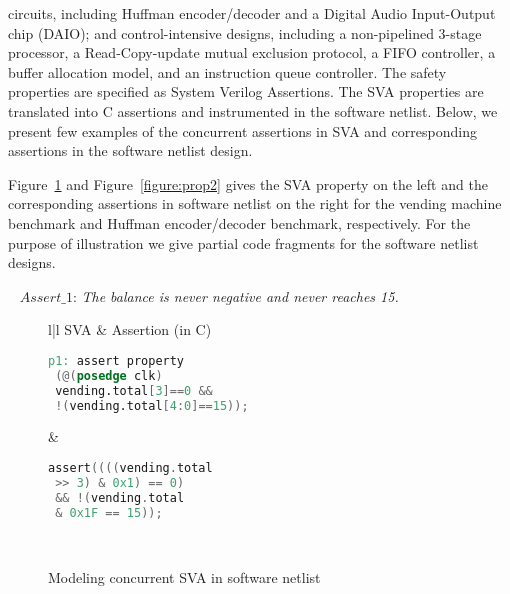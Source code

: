 circuits, including Huffman encoder/decoder and a Digital Audio
Input-Output chip (DAIO); and control-intensive designs,
including a non-pipelined 3-stage processor, a Read-Copy-update
mutual exclusion protocol, a FIFO controller, a buffer allocation model,
and an instruction queue controller.   
%
%
The safety properties are specified as System Verilog Assertions.
The SVA properties are translated into C assertions and instrumented 
in the software netlist. 
%
Below, we present few examples of the concurrent assertions in SVA 
and corresponding assertions in the software netlist design.  


Figure~\ref{figure:prop1} and Figure~\ref{figure:prop2} gives 
the SVA property on the left and the corresponding assertions 
in software netlist on the right for the vending machine benchmark 
and Huffman encoder/decoder benchmark, respectively. For the purpose 
of illustration we give partial code fragments for the software 
netlist designs.
%
\begin{example}~\label{safety-prop}
$Assert\_1$: {\em The balance is never negative and never reaches 15.} 
\begin{figure}[htbp]
\centering
\scriptsize
\begin{tabular}{l|l}
\hline
SVA & Assertion (in C)
\\
\hline
\begin{lstlisting}[mathescape=true,language=Verilog]
p1: assert property 
 (@(posedge clk) 
 vending.total[3]==0 && 
 !(vending.total[4:0]==15)); 
\end{lstlisting}
&
\begin{lstlisting}[mathescape=true,language=C]
 assert((((vending.total 
 >> 3) & 0x1) == 0) 
 && !(vending.total 
 & 0x1F == 15));
\end{lstlisting} \\
\hline
\end{tabular}
\caption{Modeling concurrent SVA in software netlist}
\label{figure:prop1}
\end{figure}
%
\end{example}
%
